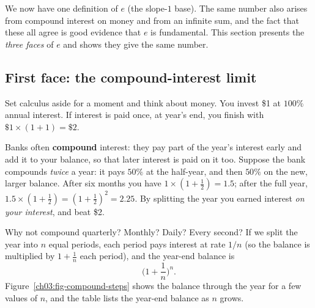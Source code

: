 We now have one definition of $e$ (the slope-$1$ base). The same number also arises from compound interest on money and from an infinite sum, and the fact that these all agree is good evidence that $e$ is fundamental. This section presents the \emph{three faces} of $e$ and shows they give the same number.

\subsection{First face: the compound-interest limit}

Set calculus aside for a moment and think about money. You invest \$1 at $100\%$ annual interest. If interest is paid once, at year's end, you finish with $\$1\times(1+1)=\$2$.

Banks often \textbf{compound} interest: they pay part of the year's interest early and add it to your balance, so that later interest is paid on it too. Suppose the bank compounds \emph{twice} a year: it pays $50\%$ at the half-year, and then $50\%$ on the new, larger balance. After six months you have $1\times(1+\tfrac12)=1.5$; after the full year, $1.5\times(1+\tfrac12)=(1+\tfrac12)^2 = 2.25$. By splitting the year you earned interest \emph{on your interest}, and beat \$2.

Why not compound quarterly? Monthly? Daily? Every second? If we split the year into $n$ equal periods, each period pays interest at rate $1/n$ (so the balance is multiplied by $1+\tfrac1n$ each period), and the year-end balance is
\[
\Big(1+\frac1n\Big)^{n}.
\]
Figure~\ref{ch03:fig-compound-steps} shows the balance through the year for a few values of $n$, and the table lists the year-end balance as $n$ grows.

